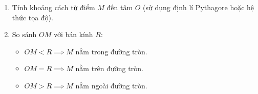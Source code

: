 \begin{enumerate}
\item Tính khoảng cách từ điểm $M$ đến tâm $O$ (sử dụng định lí Pythagore hoặc hệ thức tọa độ).
\item So sánh $OM$ với bán kính $R$:
\begin{itemize}
\item $OM < R \implies M$ nằm trong đường tròn.
\item $OM = R \implies M$ nằm trên đường tròn.
\item $OM > R \implies M$ nằm ngoài đường tròn.
\end{itemize}
\end{enumerate}
